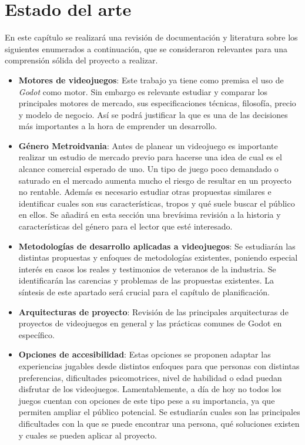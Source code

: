 \chapter{Estado del arte}

En este capítulo se realizará una revisión de documentación y literatura sobre los siguientes enumerados a continuación, que se consideraron relevantes para una comprensión sólida del proyecto a realizar.

\begin{itemize}
    \item \textbf{Motores de videojuegos}: Este trabajo ya tiene como premisa el uso de \textit{Godot} como motor. Sin embargo es relevante estudiar y comparar los principales motores de mercado, sus especificaciones técnicas, filosofía, precio y modelo de negocio. Así se podrá justificar la que es una de las decisiones más importantes a la hora de emprender un desarrollo.
    
    \item \textbf{Género Metroidvania}: Antes de planear un videojuego es importante realizar un estudio de mercado previo para hacerse una idea de cual es el alcance comercial esperado de uno. Un tipo de juego poco demandado o saturado en el mercado aumenta mucho el riesgo de resultar en un proyecto no rentable. Además es necesario estudiar otras propuestas similares e identificar cuales son sus características, tropos y qué suele buscar el público en ellos. Se añadirá en esta sección una brevísima revisión a la historia y características del género para el lector que esté interesado.
    
    \item \textbf{Metodologías de desarrollo aplicadas a videojuegos}: Se estudiarán las distintas propuestas y enfoques de metodologías existentes, poniendo especial interés en casos los reales y testimonios de veteranos de la industria. Se identificarán las carencias y problemas de las propuestas existentes. La síntesis de este apartado será crucial para el capítulo de planificación.
    
    \item \textbf{Arquitecturas de proyecto}: Revisión de las principales arquitecturas de proyectos de videojuegos en general y las prácticas comunes de Godot en específico.
    
    \item \textbf{Opciones de accesibilidad}: Estas opciones se proponen adaptar las experiencias jugables desde distintos enfoques para que personas con distintas preferencias, dificultades psicomotrices, nivel de habilidad o edad puedan disfrutar de los videojuegos. Lamentablemente, a día de hoy no todos los juegos cuentan con opciones de este tipo pese a su importancia, ya que permiten ampliar el público potencial. Se estudiarán cuales son las principales dificultades con la que se puede encontrar una persona, qué soluciones existen y cuales se pueden aplicar al proyecto.
    

\end{itemize}
